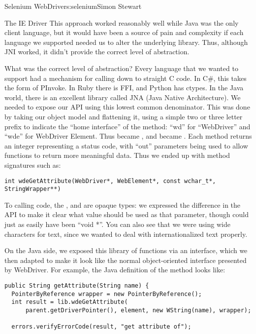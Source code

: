 \begin{aosachapter}{Selenium WebDriver}{s:selenium}{Simon Stewart}
\begin{aosasect1}{The IE Driver}
This approach worked reasonably well while Java was the only client
language, but it would have been a source of pain and complexity if
each language we supported needed us to alter the underlying
library. Thus, although JNI worked, it didn't provide the correct
level of abstraction.

What was the correct level of abstraction? Every language that we
wanted to support had a mechanism for calling down to straight C
code. In C\#, this takes the form of PInvoke. In Ruby there is FFI, and
Python has ctypes. In the Java world, there is an excellent library
called JNA (Java Native Architecture). We needed to expose our API
using this lowest common denominator. This was done by taking our
object model and flattening it, using a simple two or three letter
prefix to indicate the ``home interface'' of the method: ``wd'' for
``WebDriver'' and ``wde'' for WebDriver Element. Thus
 became , and
 became . Each method
returns an integer representing a status code, with ``out'' parameters
being used to allow functions to return more meaningful data. Thus we
ended up with method signatures such as:

\begin{verbatim}
int wdeGetAttribute(WebDriver*, WebElement*, const wchar_t*, StringWrapper**)
\end{verbatim}

\noindent To calling code, the ,  and
 are opaque types: we expressed the difference in
the API to make it clear what value should be used as that parameter,
though could just as easily have been ``void *''. You can also see
that we were using wide characters for text, since we wanted to deal
with internationalized text properly.

On the Java side, we exposed this library of functions via an
interface, which we then adapted to make it look like the normal object-oriented
interface presented by WebDriver. For example, the Java definition of
the  method looks like:

\begin{verbatim}
public String getAttribute(String name) {
  PointerByReference wrapper = new PointerByReference();
  int result = lib.wdeGetAttribute(
      parent.getDriverPointer(), element, new WString(name), wrapper);

  errors.verifyErrorCode(result, "get attribute of");


\end{verbatim}
\end{aosasect1}
\end{aosachapter}
